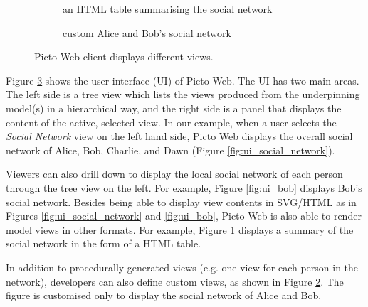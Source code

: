 \documentclass[preprint,12pt, a4paper]{elsarticle}
\begin{document}
\begin{figure}[h]
\begin{subfigure}{0.49\textwidth}
		\caption{an HTML table summarising the social network}
		\label{fig:ui_tabular}
	\end{subfigure}
	\hfill
	\begin{subfigure}{0.49\textwidth}
		\caption{custom Alice and Bob's social network}
		\label{fig:ui_custom}
	\end{subfigure}
	\hfill
	\caption{Picto Web client displays different views.}
	\label{fig:ui}
\end{figure}

Figure \ref{fig:ui} shows the user interface (UI) of Picto Web. The UI has two main areas. The left side is a tree view which lists the views produced from the underpinning model(s) in a hierarchical way, and the right side is a panel that displays the content of the active, selected view. In our example, when a user selects the \emph{Social Network} view on the left hand side, Picto Web displays the overall social network of Alice, Bob, Charlie, and Dawn (Figure \ref{fig:ui_social_network}). 

Viewers can also drill down to display the local social network of each person through the tree view on the left. For example, Figure \ref{fig:ui_bob} displays Bob's social network. Besides being able to display view contents in SVG/HTML as in Figures \ref{fig:ui_social_network} and \ref{fig:ui_bob}, Picto Web is also able to render model views in other formats. For example, Figure \ref{fig:ui_tabular} displays a summary of the social network in the form of a HTML table. 

In addition to procedurally-generated views (e.g. one view for each person in the network), developers can also define custom views, as shown in Figure \ref{fig:ui_custom}. The figure is customised only to display the social network of Alice and Bob. 
\end{document}
